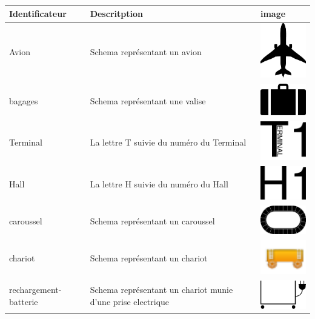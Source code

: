 \begin{longtable}{|m{3cm}|m{9cm}|m{2.5cm}|}
\hline
Identificateur & Descritption & image \\
\hline
Avion  & Schema représentant un avion & \includegraphics[width=2.5cm]{img/Avion.pdf} \\
\hline
bagages  & Schema représentant une valise & \includegraphics[width=2.5cm]{img/bagages.pdf} \\
\hline
Terminal  & La lettre T suivie du numéro du Terminal & \includegraphics[width=2.5cm]{img/Terminal.pdf} \\
\hline
Hall  & La lettre H suivie du numéro du Hall & \includegraphics[width=2.5cm]{img/Hall.pdf} \\
\hline
caroussel  & Schema représentant un caroussel & \includegraphics[width=2.5cm]{img/caroussel.pdf} \\
\hline
chariot  & Schema représentant un chariot & \includegraphics[width=2.5cm]{img/chariot.png} \\
\hline
rechargement-batterie  & Schema représentant un chariot munie d'une prise electrique & \includegraphics[width=2.5cm]{img/rechargement-batterie.pdf} \\

\end{longtable}
